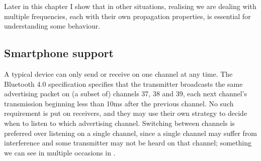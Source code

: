 Later in this chapter I show that in other situations, realising we are dealing with multiple frequencies, each with their own propagation properties, is essential for understanding some behaviour.

\subsection{Smartphone support}
\label{sec:rss-smartphone}
A typical device can only send or receive on one channel at any time.
The Bluetooth 4.0 specification \citep{bluetooth40spec} specifies that the transmitter broadcasts the same advertising packet on (a subset of) channels 37, 38 and 39, each next channel's transmission beginning less than 10ms after the previous channel. 
No such requirement is put on receivers, and they may use their own strategy to decide when to listen to which advertising channel.
Switching between channels is preferred over listening on a single channel, since a single channel may suffer from interference and some transmitter may not be heard on that channel; something we can see in multiple occasions in .

